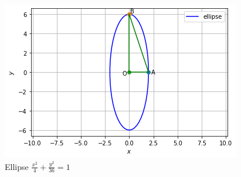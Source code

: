 \begin{figure}[!ht]
\centering
\includegraphics[width=\columnwidth]{solutions/su2021/2/99/Figure7.png}
\caption{Ellipse $\frac{x^2}{4} + \frac{y^2}{36} = 1$}
\label{quadform/2/99/fig:ellipse}	
\end{figure}


